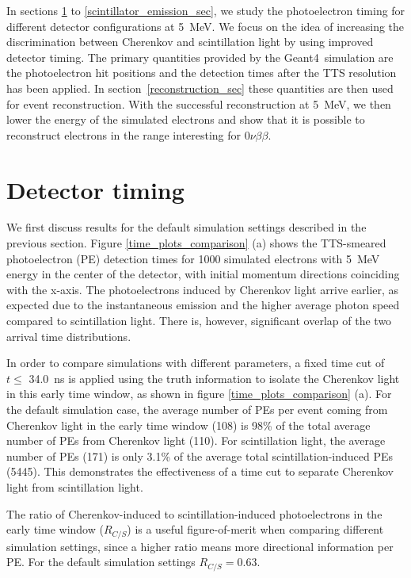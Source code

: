 \documentclass[cits]{JINST}
\begin{document}
In sections \ref{detector_timing_sec} to
\ref{scintillator_emission_sec}, we study the
photoelectron timing for different detector configurations at 5~MeV. We focus
on the idea of increasing the discrimination between Cherenkov and
scintillation light by using improved detector timing. The primary
quantities provided by the Geant4~simulation are the photoelectron hit
positions and the detection times after the TTS resolution has been
applied. In section~\ref{reconstruction_sec} these quantities are then
used for event reconstruction. With the successful reconstruction at 5~MeV, we then lower the energy of the simulated electrons and show that it is possible to reconstruct electrons in the range interesting for $0\nu\beta\beta$.

\section{Detector timing}
\label{detector_timing_sec}

We first discuss results for the default simulation settings described
in the previous section. Figure \ref{time_plots_comparison} (a) shows
the TTS-smeared photoelectron (PE) detection times for 1000 simulated
electrons with 5~MeV energy in the center of the detector, with initial
momentum directions coinciding with the x-axis. The photoelectrons
induced by Cherenkov light arrive earlier, as expected due to the
instantaneous emission and the higher average photon speed compared to
scintillation light. There is, however, significant overlap of the two
arrival time distributions.

In order to compare simulations with different parameters, a fixed
time cut of $t\leq$ 34.0~ns is applied using the truth information to
isolate the Cherenkov light in this early time window, as shown in figure \ref{time_plots_comparison} (a). For the default
simulation case, the average number of PEs per event coming from
Cherenkov light in the early time window (108) is 98\% of the total
average number of PEs from Cherenkov light (110). For scintillation
light, the average number of PEs (171) is only 3.1\% of the average total
scintillation-induced PEs (5445). This demonstrates the effectiveness of
a time cut to separate Cherenkov light from scintillation light. 

The ratio of Cherenkov-induced to scintillation-induced photoelectrons
in the early time window ($R_{C/S}$) is a useful figure-of-merit when
comparing different simulation settings, since a higher ratio means
more directional information per PE. For the default simulation
settings $R_{C/S}=0.63$.
\end{document}
